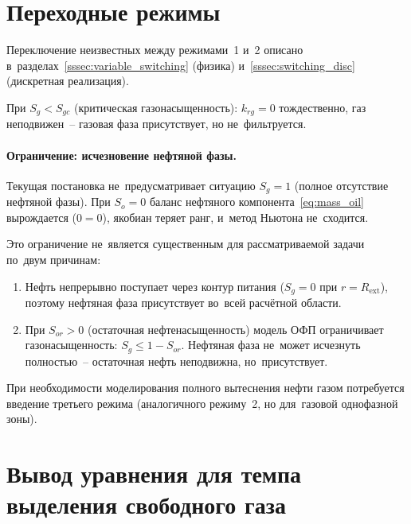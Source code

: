 \documentclass[12pt,a4paper]{article}
\newcommand{\Rext}{R_{\mathrm{ext}}}
\begin{document}
\section*{Переходные режимы}

Переключение неизвестных между режимами~1 и~2 описано
в~разделах~\ref{sssec:variable_switching} (физика)
и~\ref{sssec:switching_disc} (дискретная реализация).

При $S_g < S_{gc}$ (критическая газонасыщенность): $k_{rg} = 0$
тождественно, газ неподвижен~-- газовая фаза присутствует, но
не~фильтруется.

\paragraph{Ограничение: исчезновение нефтяной фазы.}
Текущая постановка не~предусматривает ситуацию $S_g = 1$
(полное отсутствие нефтяной фазы). При $S_o = 0$ баланс нефтяного
компонента~\eqref{eq:mass_oil} вырождается ($0 = 0$), якобиан
теряет ранг, и~метод Ньютона не~сходится.

Это ограничение не~является существенным для рассматриваемой задачи
по~двум причинам:
\begin{enumerate}[nosep]
  \item Нефть непрерывно поступает через контур питания ($S_g = 0$
        при $r = \Rext$), поэтому нефтяная фаза присутствует
        во~всей расчётной области.
  \item При $S_{or} > 0$ (остаточная нефтенасыщенность) модель ОФП
        ограничивает газонасыщенность: $S_g \leqslant 1 - S_{or}$.
        Нефтяная фаза не~может исчезнуть полностью~-- остаточная
        нефть неподвижна, но~присутствует.
\end{enumerate}
При необходимости моделирования полного вытеснения нефти газом
потребуется введение третьего режима (аналогичного режиму~2, но
для~газовой однофазной зоны).


\appendix

\section{Вывод уравнения для темпа выделения свободного газа}\label{app:degas_rate}
\end{document}
